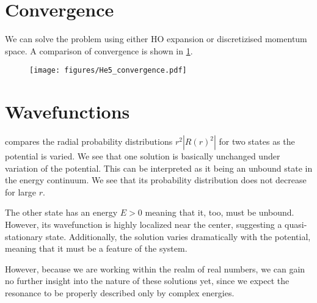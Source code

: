 \section{Convergence}
We can solve the problem using either HO expansion or discretizised momentum space. A comparison of convergence is shown in \cref{fig:HO vs mom}.
\begin{figure}
  \centering
    \texttt{[image: figures/He5\_convergence.pdf]}
  \caption{}
  \label{fig:HO vs mom}
\end{figure}

\section{Wavefunctions}

 compares the radial probability distributions $r^2|R(r)^2|$ for two states as the potential is varied. We see that one solution is basically unchanged under variation of the potential. This can be interpreted as it being an unbound state in the energy continuum. We see that its probability distribution does not decrease for large $r$.

The other state has an energy $E>0$ meaning that it, too, must be unbound. However, its wavefunction is highly localized near the center, suggesting a quasi-stationary state. Additionally, the solution varies dramatically with the potential, meaning that it must be a feature of the system. 

However, because we are working within the realm of real numbers, we can gain no further insight into the nature of these solutions yet, since we expect the resonance to be properly described only by complex energies. 


